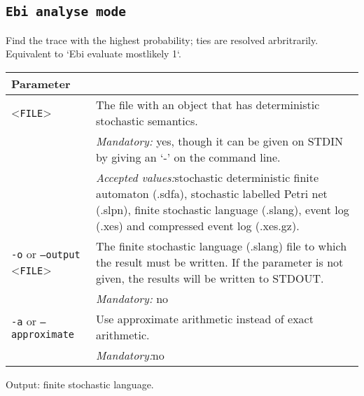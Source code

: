 {\subsection{\texttt{Ebi analyse mode}}
\label{command:Ebi analyse mode}
Find the trace with the highest probability; ties are resolved arbritrarily. Equivalent to `Ebi evaluate mostlikely 1`.\\
\begin{tabularx}{\linewidth}{lX}
\toprule
Parameter \\\midrule
<\texttt{FILE}>&The file with an object that has deterministic stochastic semantics.\\
&\textit{Mandatory:} \quad yes, though it can be given on STDIN by giving an `-' on the command line.\\
&\textit{Accepted values:}\quad stochastic deterministic finite automaton (.sdfa), stochastic labelled Petri net (.slpn), finite stochastic language (.slang), event log (.xes) and compressed event log (.xes.gz).\\
\texttt{-o} or \texttt{--output} <\texttt{FILE}> &
The finite stochastic language (.slang) file to which the result must be written. If the parameter is not given, the results will be written to STDOUT.\\
&\textit{Mandatory:} \quad no\\
\texttt{-a} or \texttt{--approximate} & Use approximate arithmetic instead of exact arithmetic.\\
&\textit{Mandatory:}\quad no\\
\bottomrule
\end{tabularx}
Output: finite stochastic language.
}
